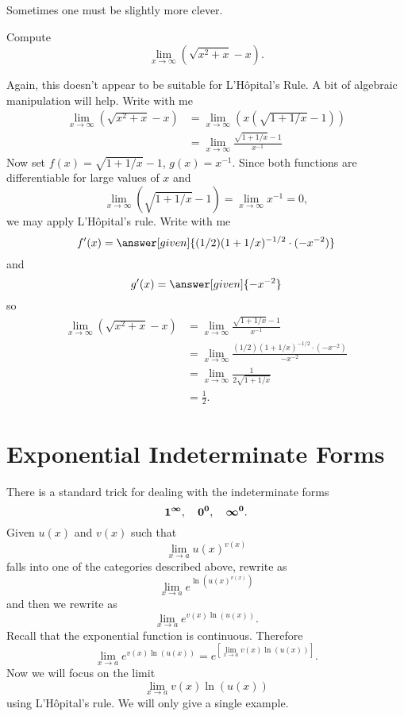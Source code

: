 \documentclass{ximera}
\begin{document}
Sometimes one must be slightly more clever. 

\begin{example}
Compute
\[
\lim_{x\to\infty}\left(\sqrt{x^2+x}-x\right).
\]
\begin{explanation}
Again, this doesn't appear to be suitable for L'H\^{o}pital's Rule. A
bit of algebraic manipulation will help. Write with me
\begin{align*}
\lim_{x\to\infty}\left(\sqrt{x^2+x}-x\right) &= \lim_{x\to\infty}\left(x\left(\sqrt{1+1/x}-1\right)\right)\\
&=\lim_{x\to\infty}\frac{\sqrt{1+1/x}-1}{x^{-1}}
\end{align*}
Now set $f(x) = \sqrt{1+1/x}-1$, $g(x) = x^{-1}$. Since both
  functions are differentiable for large values of $x$ and 
\[
\lim_{x\to\infty} (\sqrt{1+1/x}-1) = \lim_{x\to\infty}x^{-1} = 0, 
\]
we may apply L'H\^{o}pital's rule. Write with me
\[
f'(x) = \answer[given]{(1/2)(1+1/x)^{-1/2}\cdot(-x^{-2})}
\]
and
\[
g'(x) = \answer[given]{-x^{-2}}
\]
so
\begin{align*}
\lim_{x\to\infty}\left(\sqrt{x^2+x}-x\right) &= \lim_{x\to\infty}\frac{\sqrt{1+1/x}-1}{x^{-1}} \\
&= \lim_{x\to\infty}\frac{(1/2)(1+1/x)^{-1/2}\cdot(-x^{-2})}{-x^{-2}} \\
&= \lim_{x\to\infty} \frac{1}{2\sqrt{1+1/x}}\\
&= \frac{1}{2}.
\end{align*}
\end{explanation}
\end{example}

\section{Exponential Indeterminate Forms}

There is a standard trick for dealing with the indeterminate forms
\[
\boldsymbol{1^\infty},\quad \boldsymbol{0^0},\quad \boldsymbol{\infty^0}.
\]
Given $u(x)$ and $v(x)$ such that
\[
\lim_{x\to a}u(x)^{v(x)}
\]
falls into one of the categories described above, rewrite as
\[
    \lim_{x\to a}e^{\ln\left(u(x)^{v(x)}\right)}
\]
and then we rewrite as
\[
    \lim_{x\to a}e^{v(x)\ln{(u(x))}}.
\]
 Recall that the exponential function is continuous. Therefore
\[
 \lim_{x\to a}e^{v(x)\ln{(u(x))}}=e^{\left[\lim_{x\to a} v(x)\ln(u(x))\right]}. 
\]
Now we will focus on the limit
\[
\lim_{x\to a} v(x)\ln(u(x))
\]
using L'H\^{o}pital's rule. We will only give a single example.
\end{document}
